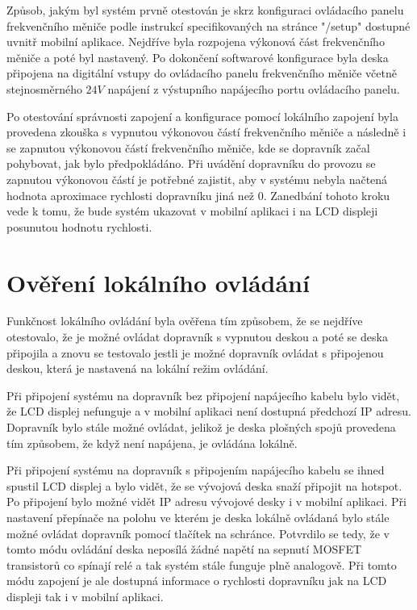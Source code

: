 Způsob, jakým byl systém prvně otestován je skrz konfiguraci ovládacího panelu frekvenčního měniče podle instrukcí specifikovaných na stránce "/setup" dostupné uvnitř mobilní aplikace. Nejdříve byla rozpojena výkonová část frekvenčního měniče a poté byl nastavený. Po dokončení softwarové konfigurace byla deska připojena na digitální vstupy do ovládacího panelu frekvenčního měniče včetně stejnosměrného $24V$ napájení z výstupního napájecího portu ovládacího panelu.

Po otestování správnosti zapojení a konfigurace pomocí lokálního zapojení byla provedena zkouška s vypnutou výkonovou částí frekvenčního měniče a následně i se zapnutou výkonovou částí frekvenčního měniče, kde se dopravník začal pohybovat, jak bylo předpokládáno. Při uvádění dopravníku do provozu se zapnutou výkonovou částí je potřebné zajistit, aby v systému nebyla načtená hodnota aproximace rychlosti dopravníku jiná než 0. Zanedbání tohoto kroku vede k tomu, že bude systém ukazovat v mobilní aplikaci i na LCD displeji posunutou hodnotu rychlosti.

\section{Ověření lokálního ovládání}

Funkčnost lokálního ovládání byla ověřena tím způsobem, že se nejdříve otestovalo, že je možné ovládat dopravník s vypnutou deskou a poté se deska připojila a znovu se testovalo jestli je možné dopravník ovládat s připojenou deskou, která je nastavená na lokální režim ovládání.

Při připojení systému na dopravník bez připojení napájecího kabelu bylo vidět, že LCD displej nefunguje a v mobilní aplikaci není dostupná předchozí IP adresu. Dopravník bylo stále možné ovládat, jelikož je deska plošných spojů provedena tím způsobem, že když není napájena, je ovládána lokálně.

Při připojení systému na dopravník s připojením napájecího kabelu se ihned spustil LCD displej a bylo vidět, že se vývojová deska snaží připojit na hotspot. Po připojení bylo možné vidět IP adresu vývojové desky i v mobilní aplikaci. Při nastavení přepínače na polohu ve kterém je deska lokálně ovládaná bylo stále možné ovládat dopravník pomocí tlačítek na schránce. Potvrdilo se tedy, že v tomto módu ovládání deska neposílá žádné napětí na sepnutí MOSFET transistorů co spínají relé a tak systém stále funguje plně analogově. Při tomto módu zapojení je ale dostupná informace o rychlosti dopravníku jak na LCD displeji tak i v mobilní aplikaci.


